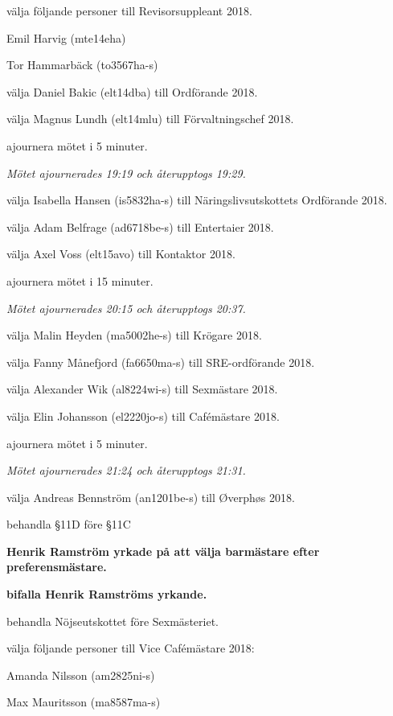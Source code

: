 \documentclass[10pt]{article}
\begin{document}
\begin{paragrafer}
\begin{paralist}
    \Mba välja följande personer till Revisorsuppleant 2018.
    \begin{tightdashlist}
        \item Emil Harvig (mte14eha)
        \item Tor Hammarbäck (to3567ha-s)
    \end{tightdashlist}

    \Mba välja Daniel Bakic (elt14dba) till Ordförande 2018.

    \Mba välja Magnus Lundh (elt14mlu) till Förvaltningschef 2018.

    \Mba ajournera mötet i 5 minuter.

    \emph{Mötet ajournerades 19:19 och återupptogs 19:29.}

    \Mba välja Isabella Hansen (is5832ha-s) till Näringslivsutskottets Ordförande 2018.

    \Mba välja Adam Belfrage (ad6718be-s) till Entertaier 2018.

    \Mba välja Axel Voss (elt15avo) till Kontaktor 2018.

    \Mba ajournera mötet i 15 minuter.

    \emph{Mötet ajournerades 20:15 och återupptogs 20:37.}

    \Mba välja Malin Heyden (ma5002he-s) till Krögare 2018.

    \Mba välja Fanny Månefjord (fa6650ma-s) till SRE-ordförande 2018.

    \Mba välja Alexander Wik (al8224wi-s) till Sexmästare 2018.

    \Mba välja Elin Johansson (el2220jo-s) till Cafémästare 2018.

    \Mba ajournera mötet i 5 minuter.

    \emph{Mötet ajournerades 21:24 och återupptogs 21:31.}

    \Mba välja Andreas Bennström (an1201be-s) till Øverphøs 2018.

    \Mba behandla \S11D före \S11C


    \textbf{Henrik Ramström yrkade på att välja barmästare efter preferensmästare.}

    \textbf{\Mba bifalla Henrik Ramströms yrkande.}

    \Mba behandla Nöjseutskottet före Sexmästeriet.

    \Mba välja följande personer till Vice Cafémästare 2018:
    \begin{tightdashlist}
        \item Amanda Nilsson (am2825ni-s)
        \item Max Mauritsson (ma8587ma-s)
    \end{tightdashlist}


\end{paralist}
\end{paragrafer}
\end{document}
